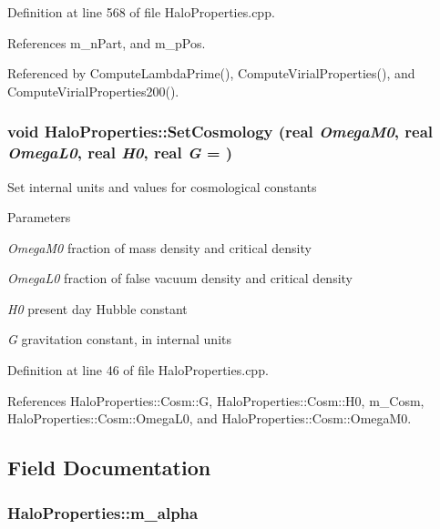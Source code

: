 Definition at line 568 of file HaloProperties.cpp.



References m\_\-nPart, and m\_\-pPos.



Referenced by ComputeLambdaPrime(), ComputeVirialProperties(), and ComputeVirialProperties200().

\subsubsection[{SetCosmology}]{\setlength{\rightskip}{0pt plus 5cm}void HaloProperties::SetCosmology ({\bf real} {\em OmegaM0}, \/  {\bf real} {\em OmegaL0}, \/  {\bf real} {\em H0}, \/  {\bf real} {\em G} = {})}\label{classHaloProperties_ad5ba044f05cff83ef00e69f3b4aef0af}
Set internal units and values for cosmological constants 
\begin{DoxyParams}{Parameters}
\item[{\em OmegaM0}]fraction of mass density and critical density \item[{\em OmegaL0}]fraction of false vacuum density and critical density \item[{\em H0}]present day Hubble constant \item[{\em G}]gravitation constant, in internal units \end{DoxyParams}


Definition at line 46 of file HaloProperties.cpp.



References HaloProperties::Cosm::G, HaloProperties::Cosm::H0, m\_\-Cosm, HaloProperties::Cosm::OmegaL0, and HaloProperties::Cosm::OmegaM0.



\subsection{Field Documentation}
\subsubsection[{m\_\-alpha}]{ {\bf HaloProperties::m\_\-alpha}}\label{classHaloProperties_af1ec4657f196c3bcf725200a0f4206d9}


